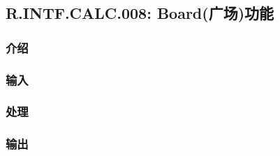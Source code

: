\subsection{R.INTF.CALC.008: Board(广场)功能}
\subsubsection{介绍}
\subsubsection{输入}
\subsubsection{处理}
\subsubsection{输出}
